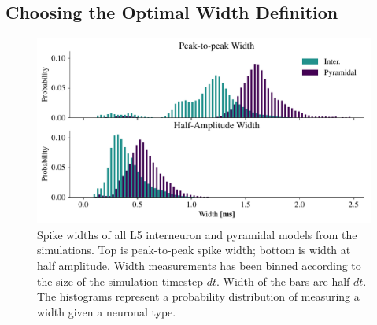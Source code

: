 \documentclass[altfont, fleqn]{uiophd}
\begin{document}
\newpage
\subsection{Choosing the Optimal Width Definition}
\label{sec:optimal_width_def}

\begin{figure}[h]
    \begin{center}
        \includegraphics[width=\textwidth]{images/sec_4/int_pyr_width_I_II.pdf}
        \caption{
            Spike widths of all L5 interneuron and pyramidal models from
            the simulations. 
            Top is peak-to-peak spike width; bottom is 
            width at half amplitude.
            Width measurements has been binned according to 
            the size of the simulation timestep 
            $dt$.
            Width of the bars are half $dt$.
            The histograms represent a probability distribution of measuring a width
            given a neuronal type. 
        }
        \label{fig:4_width_I_II_histograms}
    \end{center}
\end{figure}
\end{document}
